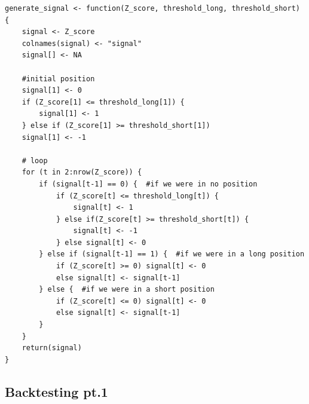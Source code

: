 \documentclass[]{article}
\begin{document}
\begin{lstlisting}
generate_signal <- function(Z_score, threshold_long, threshold_short) {
	signal <- Z_score
	colnames(signal) <- "signal"
	signal[] <- NA
	
	#initial position
	signal[1] <- 0
	if (Z_score[1] <= threshold_long[1]) {
		signal[1] <- 1
	} else if (Z_score[1] >= threshold_short[1])
	signal[1] <- -1
	
	# loop
	for (t in 2:nrow(Z_score)) {
		if (signal[t-1] == 0) {  #if we were in no position
			if (Z_score[t] <= threshold_long[t]) {
				signal[t] <- 1
			} else if(Z_score[t] >= threshold_short[t]) {
				signal[t] <- -1
			} else signal[t] <- 0
		} else if (signal[t-1] == 1) {  #if we were in a long position
			if (Z_score[t] >= 0) signal[t] <- 0
			else signal[t] <- signal[t-1]
		} else {  #if we were in a short position
			if (Z_score[t] <= 0) signal[t] <- 0
			else signal[t] <- signal[t-1]
		}
	}
	return(signal)
}
\end{lstlisting}

\subsection*{Backtesting pt.1}
\end{document}
